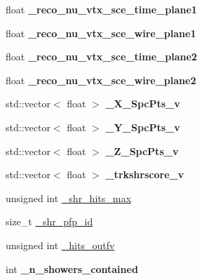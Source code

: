 \begin{DoxyCompactItemize}
\item 
float {\bfseries \+\_\+reco\+\_\+nu\+\_\+vtx\+\_\+sce\+\_\+time\+\_\+plane1}\hypertarget{classanalysis_1_1MCS_a7a2d5a09931c3046163059c9d431d5b6}{}\label{classanalysis_1_1MCS_a7a2d5a09931c3046163059c9d431d5b6}

\item 
float {\bfseries \+\_\+reco\+\_\+nu\+\_\+vtx\+\_\+sce\+\_\+wire\+\_\+plane1}\hypertarget{classanalysis_1_1MCS_ad96ec6546d0e4e3fcf3a0cdf7bbb2de8}{}\label{classanalysis_1_1MCS_ad96ec6546d0e4e3fcf3a0cdf7bbb2de8}

\item 
float {\bfseries \+\_\+reco\+\_\+nu\+\_\+vtx\+\_\+sce\+\_\+time\+\_\+plane2}\hypertarget{classanalysis_1_1MCS_a5192c2313e78f71045fecd059e7aadd7}{}\label{classanalysis_1_1MCS_a5192c2313e78f71045fecd059e7aadd7}

\item 
float {\bfseries \+\_\+reco\+\_\+nu\+\_\+vtx\+\_\+sce\+\_\+wire\+\_\+plane2}\hypertarget{classanalysis_1_1MCS_a18e980ef9fd0c64d38df397d8e7020b0}{}\label{classanalysis_1_1MCS_a18e980ef9fd0c64d38df397d8e7020b0}

\item 
std\+::vector$<$ float $>$ {\bfseries \+\_\+\+X\+\_\+\+Spc\+Pts\+\_\+v}\hypertarget{classanalysis_1_1MCS_a27b771e4eff583bf2e0234a408c6a699}{}\label{classanalysis_1_1MCS_a27b771e4eff583bf2e0234a408c6a699}

\item 
std\+::vector$<$ float $>$ {\bfseries \+\_\+\+Y\+\_\+\+Spc\+Pts\+\_\+v}\hypertarget{classanalysis_1_1MCS_a90cea8083ce9130aafa7da5553f69716}{}\label{classanalysis_1_1MCS_a90cea8083ce9130aafa7da5553f69716}

\item 
std\+::vector$<$ float $>$ {\bfseries \+\_\+\+Z\+\_\+\+Spc\+Pts\+\_\+v}\hypertarget{classanalysis_1_1MCS_a08edabf911701882f3e303f694330722}{}\label{classanalysis_1_1MCS_a08edabf911701882f3e303f694330722}

\item 
std\+::vector$<$ float $>$ {\bfseries \+\_\+trkshrscore\+\_\+v}\hypertarget{classanalysis_1_1MCS_a8d4f8e9a3aeeaa46eb292f6993a852da}{}\label{classanalysis_1_1MCS_a8d4f8e9a3aeeaa46eb292f6993a852da}

\item 
unsigned int \hyperlink{classanalysis_1_1MCS_a497f861469c78449dc3c1b685b460b84}{\+\_\+shr\+\_\+hits\+\_\+max}
\item 
size\+\_\+t \hyperlink{classanalysis_1_1MCS_a3072ad9091904d76bc24531bfd928045}{\+\_\+shr\+\_\+pfp\+\_\+id}
\item 
unsigned int \hyperlink{classanalysis_1_1MCS_acdad4ea343efb4ded95933b0f28d9204}{\+\_\+hits\+\_\+outfv}
\item 
int {\bfseries \+\_\+n\+\_\+showers\+\_\+contained}\hypertarget{classanalysis_1_1MCS_a6c580b67a6238191e27b5ffd01cf2c56}{}\label{classanalysis_1_1MCS_a6c580b67a6238191e27b5ffd01cf2c56}


\end{DoxyCompactItemize}
